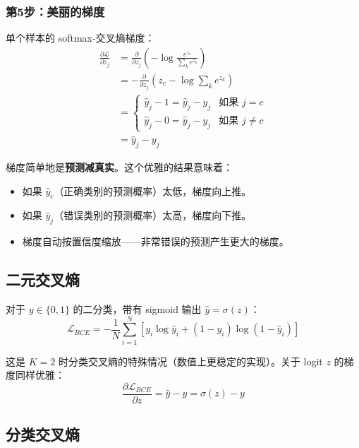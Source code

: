 \subsubsection{第5步：美丽的梯度}

单个样本的 softmax-交叉熵梯度：
\begin{align}
\frac{\partial \mathcal{L}}{\partial z_j} &= \frac{\partial}{\partial z_j}\left(-\log \frac{e^{z_{c}}}{\sum_k e^{z_k}}\right) \\
&= -\frac{\partial}{\partial z_j}\left(z_c - \log \sum_k e^{z_k}\right) \\
&= \begin{cases}
\hat{y}_j - 1 = \hat{y}_j - y_j & \text{如果 } j = c \\
\hat{y}_j - 0 = \hat{y}_j - y_j & \text{如果 } j \neq c
\end{cases} \\
&= \boxed{\hat{y}_j - y_j}
\end{align}

梯度简单地是\textbf{预测减真实}。这个优雅的结果意味着：
\begin{itemize}
    \item 如果 $\hat{y}_c$（正确类别的预测概率）太低，梯度向上推。
    \item 如果 $\hat{y}_j$（错误类别的预测概率）太高，梯度向下推。
    \item 梯度自动按置信度缩放——非常错误的预测产生更大的梯度。
\end{itemize}

\subsection{二元交叉熵}

对于 $y \in \{0, 1\}$ 的二分类，带有 sigmoid 输出 $\hat{y} = \sigma(z)$：
\begin{equation}
\mathcal{L}_{BCE} = -\frac{1}{N}\sum_{i=1}^{N}\left[y_i \log \hat{y}_i + (1-y_i) \log(1-\hat{y}_i)\right]
\end{equation}

这是 $K = 2$ 时分类交叉熵的特殊情况（数值上更稳定的实现）。关于 logit $z$ 的梯度同样优雅：
\begin{equation}
\frac{\partial \mathcal{L}_{BCE}}{\partial z} = \hat{y} - y = \sigma(z) - y
\end{equation}

\subsection{分类交叉熵}

